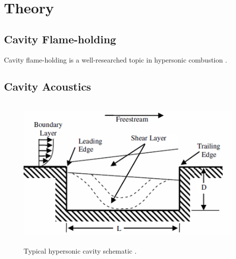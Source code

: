 
\chapter{Theory} %

\label{Chapter2} %



\section{Cavity Flame-holding}
Cavity flame-holding is a well-researched topic in hypersonic combustion \cite{}. 




\section{Cavity Acoustics}





\newpage

\begin{figure}
\centering
\includegraphics[height=3in]{Figures/CavityDiagram.png}
\caption[Diagram of typical cavity]{Typical hypersonic cavity schematic \cite{lazar2008control}.}
\end{figure}